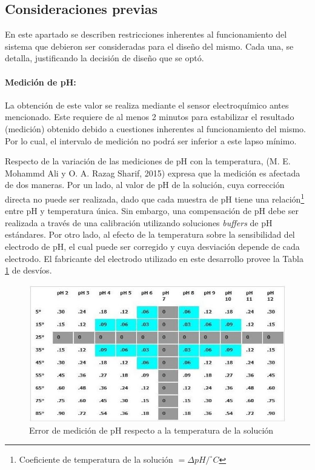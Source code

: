     \subsection{Consideraciones previas}
        \par En este apartado se describen restricciones inherentes al funcionamiento del sistema que debieron ser consideradas para el diseño del mismo. Cada una, se detalla, justificando la decisión de diseño que se optó.
        
        \paragraph{Medición de pH:} 
            La obtención de este valor se realiza mediante el sensor electroquímico antes mencionado. Este requiere de al menos 2 minutos para estabilizar el resultado (medición) obtenido debido a cuestiones inherentes al funcionamiento del mismo. Por lo cual, el intervalo de medición no podrá ser inferior a este lapso mínimo.
            
            \par Respecto de la variación de las mediciones de pH con la temperatura, (M. E. Mohammd Ali y O. A. Razag Sharif, 2015) expresa que la medición es afectada de dos maneras. Por un lado, al valor de pH de la solución, cuya corrección directa no puede ser realizada, dado que cada muestra de pH tiene una relación\footnote{Coeficiente de temperatura de la solución  $ = \Delta pH/ ^{\circ}C $} entre pH y temperatura única. Sin embargo, una compensación de pH debe ser realizada a través de una calibración utilizando soluciones \textit{buffers} de pH estándares. Por otro lado, al efecto de la temperatura sobre la sensibilidad del electrodo de pH, el cual puede ser corregido y cuya desviación depende de cada electrodo. El fabricante del electrodo utilizado en este desarrollo provee la Tabla \ref{tablePhvsTemp} de desvíos. 
            
            \begin{figure}[h] 
                \centering
                \includegraphics[scale=0.9]{errorMedicionPh.jpg}
                \caption{Error de medición de pH respecto a la temperatura de la solución}
                \label{tablePhvsTemp}
            \end{figure}
            
